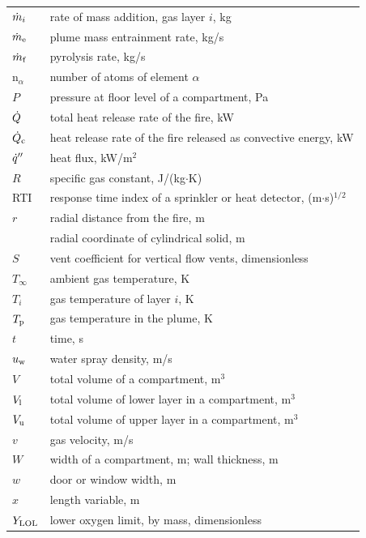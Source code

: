 \documentclass[12pt]{book}
\begin{document}
\begin{center}
\begin{longtable}{p{1in}  p{5.5 in}}
$\dot{m}_i$             & rate of mass addition, gas layer $i$, kg \\
$\dot{m}_{\rm e}$              & plume mass entrainment rate, kg/s \\
$\dot{m}_{\rm f}$              & pyrolysis rate, kg/s \\
n$_\alpha$          & number of atoms of element $\alpha$ \\
$P$                 & pressure at floor level of a compartment, Pa \\
$\dot{Q}$               & total heat release rate of the fire, kW \\
$\dot{Q}_{\rm c}$              & heat release rate of the fire released as convective energy, kW \\
$\dot{q}''$             & heat flux, kW/m$^2$ \\
$R$                 & specific gas constant, J/(kg$\cdot$K) \\
RTI                 & response time index of a sprinkler or heat detector, (m$\cdot$s)$^{1/2}$ \\
$r$                 & radial distance from the fire, m \\
                    & radial coordinate of cylindrical solid, m \\
$S$                 & vent coefficient for vertical flow vents, dimensionless \\
$T_\infty$          & ambient gas temperature, K \\
$T_i$               & gas temperature of layer $i$, K \\
$T_{\rm p}$               & gas temperature in the plume, K \\
$t$                 & time, s \\
$u_{\rm w}$         & water spray density, m/s \\
$V$                 & total volume of a compartment, m$^3$ \\
$V_{\rm l}$               & total volume of lower layer in a compartment, m$^3$ \\
$V_{\rm u}$               & total volume of upper layer in a compartment, m$^3$ \\
$v$                 & gas velocity, m/s \\
$W$                 & width of a compartment, m; wall thickness, m \\
$w$                 & door or window width, m \\
$x$                 & length variable, m \\
$Y_{\rm LOL}$       & lower oxygen limit, by mass, dimensionless \\

\end{longtable}
\end{center}
\end{document}
